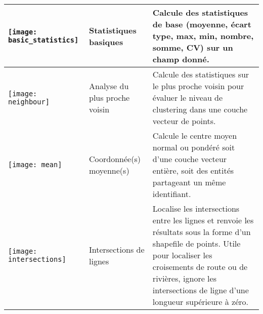 \begin{table}[ht]
\begin{tabular}{|p{0.3in}|p{1.2in}|p{4.7in}|}
 \hline \texttt{[image: basic\_statistics]} & Statistiques basiques & Calcule des statistiques de base (moyenne, écart type, max, min, nombre, somme, CV) sur un champ donné. \\ 
 \hline \texttt{[image: neighbour]} & Analyse du plus proche voisin & Calcule des statistiques sur le plus proche voisin pour évaluer le niveau de clustering dans une couche vecteur de points. \\
 \hline \texttt{[image: mean]} & Coordonnée(s) moyenne(s) & Calcule le centre moyen normal ou pondéré soit d'une couche vecteur entière, soit des entités partageant un même identifiant. \\ 
 \hline \texttt{[image: intersections]} & Intersections de lignes & Localise les intersections entre les lignes et renvoie les résultats sous la forme d'un shapefile de points. Utile pour localiser les croisements de route ou de rivières, ignore les intersections de ligne d'une longueur supérieure à zéro. \\
 \hline
\end{tabular}
\end{table}

